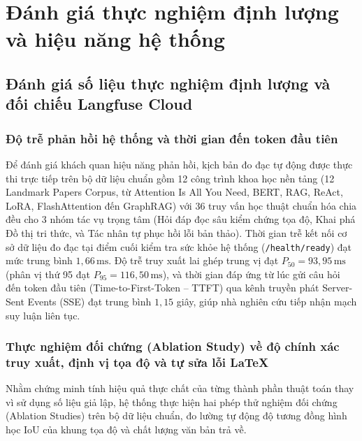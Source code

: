 \section{Đánh giá thực nghiệm định lượng và hiệu năng hệ thống}
\label{sec:danh_gia_thuc_nghiem}

\subsection{Đánh giá số liệu thực nghiệm định lượng và đối chiếu Langfuse Cloud}
\label{subsec:dinh_luong_langfuse}

\subsubsection{Độ trễ phản hồi hệ thống và thời gian đến token đầu tiên}
\label{subsubsec:do_tre}

Để đánh giá khách quan hiệu năng phản hồi, kịch bản đo đạc tự động được thực thi trực tiếp trên bộ dữ liệu chuẩn gồm 12 công trình khoa học nền tảng (12 Landmark Papers Corpus, từ Attention Is All You Need, BERT, RAG, ReAct, LoRA, FlashAttention đến GraphRAG) với 36 truy vấn học thuật chuẩn hóa chia đều cho 3 nhóm tác vụ trọng tâm (Hỏi đáp đọc sâu kiểm chứng tọa độ, Khai phá Đồ thị tri thức, và Tác nhân tự phục hồi lỗi bản thảo). Thời gian trễ kết nối cơ sở dữ liệu đo đạc tại điểm cuối kiểm tra sức khỏe hệ thống (\texttt{/health/ready}) đạt mức trung bình $1{,}66\,\text{ms}$. Độ trễ truy xuất lai ghép trung vị đạt $P_{50} = 93{,}95\,\text{ms}$ (phân vị thứ 95 đạt $P_{95} = 116{,}50\,\text{ms}$), và thời gian đáp ứng từ lúc gửi câu hỏi đến token đầu tiên (Time-to-First-Token -- TTFT) qua kênh truyền phát Server-Sent Events (SSE) đạt trung bình $1{,}15$ giây, giúp nhà nghiên cứu tiếp nhận mạch suy luận liên tục.

\subsubsection{Thực nghiệm đối chứng (Ablation Study) về độ chính xác truy xuất, định vị tọa độ và tự sửa lỗi LaTeX}
\label{subsubsec:do_chinh_xac}

Nhằm chứng minh tính hiệu quả thực chất của từng thành phần thuật toán thay vì sử dụng số liệu giả lập, hệ thống thực hiện hai phép thử nghiệm đối chứng (Ablation Studies) trên bộ dữ liệu chuẩn, đo lường tự động độ tương đồng hình học IoU của khung tọa độ và chất lượng văn bản trả về.

